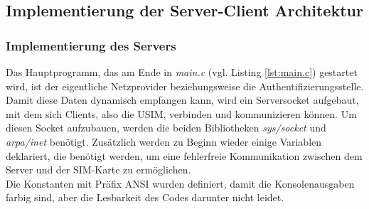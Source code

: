 \clearpage
\subsection[Implementierung der Server-Client Architektur (Schenkel \& Heumann)]{Implementierung der Server-Client Architektur}
\label{server-client-architektur}
	\subsubsection[Implementierung des Servers (Heumann)]{Implementierung des Servers}
    	\label{subsec:impl_server}
	Das Hauptprogramm, das am Ende in \emph{main.c} (vgl. Listing \ref{lst:main.c}) gestartet wird, ist der eigentliche
	Netzprovider beziehungsweise
	die Authentifizierungsstelle. Damit diese Daten dynamisch empfangen kann, wird ein Serversocket aufgebaut,
	mit dem sich Clients, also die USIM, verbinden und kommunizieren können. Um diesen Socket aufzubauen, werden
	die beiden Bibliotheken \emph{sys/socket} und \emph{arpa/inet} benötigt. Zusätzlich werden zu Beginn wieder
	einige Variablen deklariert, die benötigt werden, um eine fehlerfreie Kommunikation zwischen dem Server und der SIM-Karte
	zu ermöglichen. \\
	Die Konstanten mit Präfix ANSI wurden definiert, damit die Konsolenausgaben farbig sind, aber die Lesbarkeit des
	Codes darunter nicht leidet.
	
